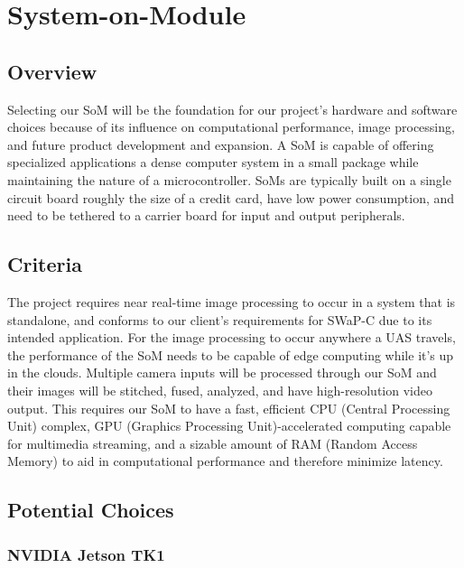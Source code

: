 \documentclass[letterpaper,10pt,serif,draftclsnofoot,onecolumn,compsoc,titlepage]{IEEEtran}
\begin{document}
\section{System-on-Module}

\subsection{Overview}

Selecting our SoM will be the foundation for our project's hardware 
and software choices because of its influence on computational performance, image 
processing, and future product development and expansion. A SoM is capable of offering 
specialized applications a dense computer system in a small package while
maintaining the nature of a microcontroller. SoMs are typically built on a single 
circuit board roughly the size of a credit card, have low power consumption, and 
need to be tethered to a carrier board for input and output peripherals.\\

\subsection{Criteria}

The project requires near real-time image processing to occur in a system that is 
standalone, and conforms to our client's requirements for SWaP-C due to its intended application. For the image processing to 
occur anywhere a UAS travels, the performance of the SoM 
needs to be capable of edge computing while it's up in the clouds.
Multiple camera inputs will be processed through our SoM and their images will be 
stitched, fused, analyzed, and have high-resolution video output. This requires our 
SoM to have a fast, efficient CPU (Central Processing Unit) complex, GPU 
(Graphics Processing Unit)-accelerated computing capable for multimedia streaming, and 
a sizable amount of RAM (Random Access Memory) to aid in computational performance 
and therefore minimize latency.\\

\subsection{Potential Choices}

\subsubsection{NVIDIA Jetson TK1}
\end{document}
